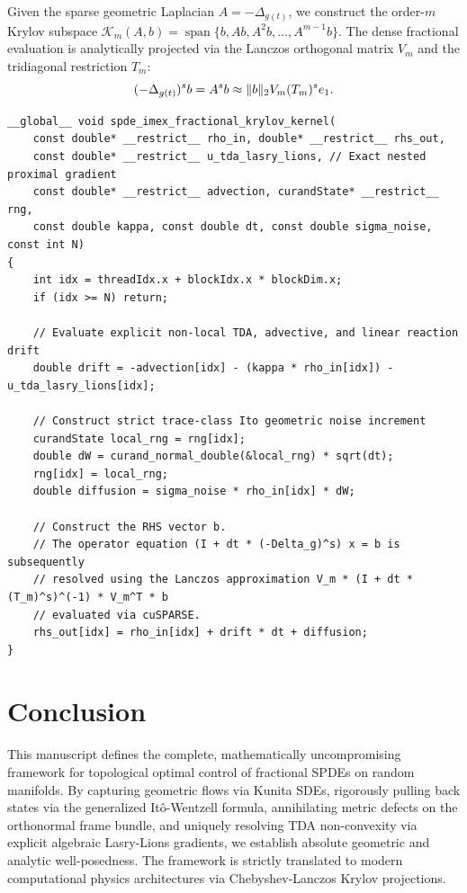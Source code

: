 \documentclass[11pt,a4paper]{article}
\DeclarePairedDelimiter{\norm}{\lVert}{\rVert}
\DeclareMathOperator{\spanop}{span}
\theoremstyle{plain}
\theoremstyle{definition}
\theoremstyle{remark}
\begin{document}
Given the sparse geometric Laplacian $A = -\Delta_{g(t)}$, we construct the order-$m$ Krylov subspace $\mathcal{K}_m(A, b) = \spanop\{b, Ab, A^2b, \dots, A^{m-1}b\}$. The dense fractional evaluation is analytically projected via the Lanczos orthogonal matrix $V_m$ and the tridiagonal restriction $T_m$:
\begin{equation}
    (-\Delta_{g(t)})^s b = A^s b \approx \norm{b}_2 V_m (T_m)^s e_1.
\end{equation}

\begin{lstlisting}[caption={Fractional SPDE: Chebyshev Krylov IMEX Kernel (CUDA C++)}, label={lst:imex}]
__global__ void spde_imex_fractional_krylov_kernel(
    const double* __restrict__ rho_in, double* __restrict__ rhs_out,
    const double* __restrict__ u_tda_lasry_lions, // Exact nested proximal gradient
    const double* __restrict__ advection, curandState* __restrict__ rng, 
    const double kappa, const double dt, const double sigma_noise, const int N) 
{
    int idx = threadIdx.x + blockIdx.x * blockDim.x;
    if (idx >= N) return;
    
    // Evaluate explicit non-local TDA, advective, and linear reaction drift
    double drift = -advection[idx] - (kappa * rho_in[idx]) - u_tda_lasry_lions[idx];
    
    // Construct strict trace-class Ito geometric noise increment
    curandState local_rng = rng[idx];
    double dW = curand_normal_double(&local_rng) * sqrt(dt);
    rng[idx] = local_rng;
    double diffusion = sigma_noise * rho_in[idx] * dW; 
    
    // Construct the RHS vector b.
    // The operator equation (I + dt * (-Delta_g)^s) x = b is subsequently 
    // resolved using the Lanczos approximation V_m * (I + dt * (T_m)^s)^(-1) * V_m^T * b 
    // evaluated via cuSPARSE.
    rhs_out[idx] = rho_in[idx] + drift * dt + diffusion;
}
\end{lstlisting}

\section{Conclusion}
This manuscript defines the complete, mathematically uncompromising framework for topological optimal control of fractional SPDEs on random manifolds. By capturing geometric flows via Kunita SDEs, rigorously pulling back states via the generalized It\^{o}-Wentzell formula, annihilating metric defects on the orthonormal frame bundle, and uniquely resolving TDA non-convexity via explicit algebraic Lasry-Lions gradients, we establish absolute geometric and analytic well-posedness. The framework is strictly translated to modern computational physics architectures via Chebyshev-Lanczos Krylov projections.
\end{document}
